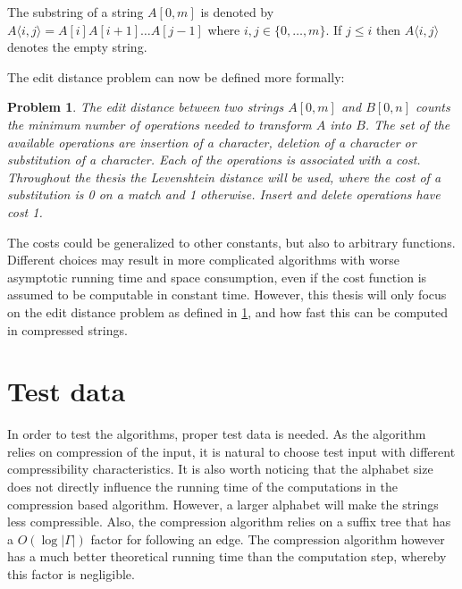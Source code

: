 \documentclass[twoside,11pt,openright]{report}
\newcommand{\substr}[3]{#1\langle #2, #3 \rangle}
\newcommand{\str}[3]{#1[#2, #3]}
\newtheorem{problem}{Problem}
\begin{document}
The substring of a string $\str{A}{0}{m}$ is denoted by $\substr{A}{i}{j} = A[i]A[i+1]\dots A[j - 1]$ where $i, j \in \{0, \dots, m\}$. If $j \leq i$ then $\substr{A}{i}{j}$ denotes the empty string.

The edit distance problem can now be defined more formally:
\begin{problem}
  \label{problem:edit-distance}
  The edit distance between two strings $\str{A}{0}{m}$ and $\str{B}{0}{n}$ counts the minimum number of operations needed to transform $A$ into $B$. The set of the available operations are insertion of a character, deletion of a character or substitution of a character. Each of the operations is associated with a cost. Throughout the thesis the Levenshtein distance will be used, where the cost of a substitution is 0 on a match and 1 otherwise. Insert and delete operations have cost 1.
\end{problem}
The costs could be generalized to other constants, but also to arbitrary functions. Different choices may result in more complicated algorithms with worse asymptotic running time and space consumption, even if the cost function is assumed to be computable in constant time. However, this thesis will only focus on the edit distance problem as defined in \cref{problem:edit-distance}, and how fast this can be computed in compressed strings.

\section{Test data}
\label{sec:intro:test-data}
In order to test the algorithms, proper test data is needed. As the algorithm relies on compression of the input, it is natural to choose test input with different compressibility characteristics. It is also worth noticing that the alphabet size does not directly influence the running time of the computations in the compression based algorithm. However, a larger alphabet will make the strings less compressible. Also, the compression algorithm relies on a suffix tree that has a $O(\log |\Gamma|)$ factor for following an edge. The compression algorithm however has a much better theoretical running time than the computation step, whereby this factor is negligible.
\end{document}
